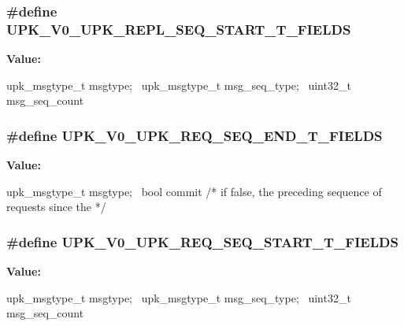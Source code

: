 \subsubsection[{UPK\_\-V0\_\-UPK\_\-REPL\_\-SEQ\_\-START\_\-T\_\-FIELDS}]{\setlength{\rightskip}{0pt plus 5cm}\#define UPK\_\-V0\_\-UPK\_\-REPL\_\-SEQ\_\-START\_\-T\_\-FIELDS}\label{upk__v0__protocol__structs_8h_aaf84780293d35388fa934a52caede103}
{\bfseries Value:}
\begin{DoxyCode}
upk_msgtype_t      msgtype; \
    upk_msgtype_t      msg_seq_type; \
    uint32_t                msg_seq_count
\end{DoxyCode}
\subsubsection[{UPK\_\-V0\_\-UPK\_\-REQ\_\-SEQ\_\-END\_\-T\_\-FIELDS}]{\setlength{\rightskip}{0pt plus 5cm}\#define UPK\_\-V0\_\-UPK\_\-REQ\_\-SEQ\_\-END\_\-T\_\-FIELDS}\label{upk__v0__protocol__structs_8h_a8e291343050a458d205a0f05b0169eb0}
{\bfseries Value:}
\begin{DoxyCode}
upk_msgtype_t       msgtype; \
    bool                commit                         /* if false, the preceding
       sequence of requests since the */ \
\end{DoxyCode}
\subsubsection[{UPK\_\-V0\_\-UPK\_\-REQ\_\-SEQ\_\-START\_\-T\_\-FIELDS}]{\setlength{\rightskip}{0pt plus 5cm}\#define UPK\_\-V0\_\-UPK\_\-REQ\_\-SEQ\_\-START\_\-T\_\-FIELDS}\label{upk__v0__protocol__structs_8h_a14cd585fa9163e91801363c2288cef5b}
{\bfseries Value:}
\begin{DoxyCode}
upk_msgtype_t       msgtype; \
    upk_msgtype_t       msg_seq_type; \
    uint32_t            msg_seq_count
\end{DoxyCode}
